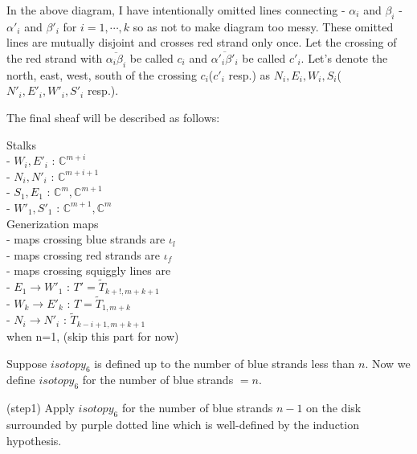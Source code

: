 In the above diagram, I have intentionally omitted lines connecting
- $\alpha_i$ and $\beta_i$
- $\alpha'_i$ and $\beta'_i$
for $i=1,\cdots,k$ so as not to make diagram too messy. These omitted lines are mutually disjoint and crosses red strand only once.
Let the crossing of the red strand with $\overline{\alpha_i \beta_i}$ be called $c_i$ and $\overline{\alpha'_i \beta'_i}$ be called $c'_i$.
Let's denote the north, east, west, south of the crossing $c_i$($c'_i$ resp.) as $N_i,E_i,W_i,S_i$($N'_i,E'_i,W'_i,S'_i$ resp.).

The final sheaf will be described as follows:

Stalks\\
- $W_i,E'_i$ : $\mathbb{C}^{m+i}$ \\
- $N_i,N'_i$ : $\mathbb{C}^{m+i+1}$ \\
- $S_1,E_1$ : $\mathbb{C}^{m}, \mathbb{C}^{m+1}$\\
- $W'_1,S'_1$ : $\mathbb{C}^{m+1}, \mathbb{C}^m$\\

Generization maps\\ 
- maps crossing blue strands are $\iota_l$\\
- maps crossing red strands are $\iota_f$\\
- maps crossing squiggly lines are\\
	- $E_1\rightarrow W'_1$ : $T' = \tilde{T}_{k+!,m+k+1}$\\
	- $W_k\rightarrow E'_k$ : $T = \tilde{T}_{1,m+k}$\\
	- $N_i \rightarrow N'_i$ : $\tilde{T}_{k-i+1,m+k+1}$\\
	
	
when n=1, (skip this part for now)

Suppose $isotopy_6$ is defined up to the number of blue strands less than $n$. Now we define $isotopy_6$ for the number of blue strands $=n$.

(step1) Apply $isotopy_6$ for the number of blue strands $n-1$ on the disk surrounded by purple dotted line which is well-defined by the induction hypothesis.

